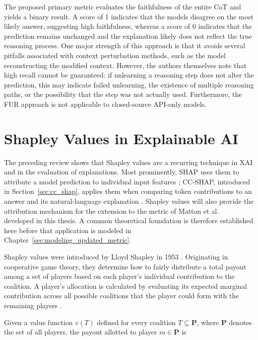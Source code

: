 The proposed primary metric evaluates the faithfulness of the entire CoT and yields a binary result. A score of 1 indicates that the models disagree on the most likely answer, suggesting high faithfulness, whereas a score of 0 indicates that the prediction remains unchanged and the explanation likely does not reflect the true reasoning process. One major strength of this approach is that it avoids several pitfalls associated with context perturbation methods, such as the model reconstructing the modified context. However, the authors themselves note that high recall cannot be guaranteed: if unlearning a reasoning step does not alter the prediction, this may indicate failed unlearning, the existence of multiple reasoning paths, or the possibility that the step was not actually used. Furthermore, the FUR approach is not applicable to closed-source API-only models.

\section{Shapley Values in Explainable AI}
\label{sec:shapley_fundamentals}
The preceding review shows that Shapley values are a recurring technique in XAI and in the evaluation of explanations. Most prominently, SHAP uses them to attribute a model prediction to individual input features \cite{lundbergUnifiedApproachInterpreting2017}; CC-SHAP, introduced in Section~\ref{sec:cc_shap}, applies them when comparing token contributions to an answer and its natural-language explanation \cite{parcalabescuMeasuringFaithfulnessSelfconsistency2024}. Shapley values will also provide the attribution mechanism for the extension to the metric of Matton et al.~\cite{mattonWalkTalkMeasuring2024} developed in this thesis. A common theoretical foundation is therefore established here before that application is modeled in Chapter~\ref{sec:modeling_updated_metric}.

Shapley values were introduced by Lloyd Shapley in 1953 \cite{shapley17ValueNPerson1953}. Originating in cooperative game theory, they determine how to fairly distribute a total payout among a set of players based on each player's individual contribution to the coalition. A player's allocation is calculated by evaluating its expected marginal contribution across all possible coalitions that the player could form with the remaining players \cite{shapley17ValueNPerson1953, mitchellSamplingPermutationsShapley2022, parcalabescuMeasuringFaithfulnessSelfconsistency2024}.

Given a value function $v(T)$ defined for every coalition $T \subseteq \mathbf{P}$, where $\mathbf{P}$ denotes the set of all players, the payout allotted to player $m \in \mathbf{P}$ is

